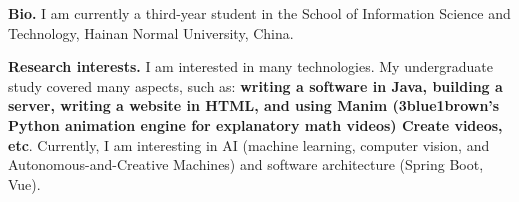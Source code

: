 %
%

\par{
{\textbf{Bio.}} 
I am currently a third-year student in the School of Information Science and Technology, Hainan Normal University, China.

{\textbf{Research interests.}} 
I am interested in many technologies. My undergraduate study covered many aspects, such as: \textbf{writing a software in Java,  building a server, writing a website in HTML, and using Manim (3blue1brown's Python animation engine for explanatory math videos)  Create videos, etc}. 
Currently, I am interesting in AI (machine learning, computer vision, and Autonomous-and-Creative Machines) and software architecture (Spring Boot, Vue).
}